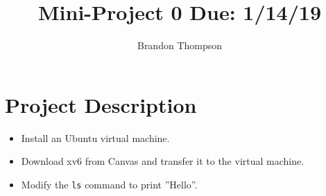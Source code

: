\documentclass[a4paper]{article}
\begin{document}
	\title{Mini-Project 0 Due: 1/14/19}
	\author{Brandon Thompson }
	\maketitle

	\section*{Project Description}
	\begin{itemize}
		\item Install an Ubuntu virtual machine.
		\item Download xv6 from Canvas and transfer it to the virtual machine.
		\item Modify the \verb+ls+ command to print ''Hello''.
	\end{itemize}
\end{document}
